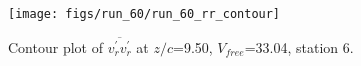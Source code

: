 \begin{figure}[H]
\centering
\texttt{[image: figs/run\_60/run\_60\_rr\_contour]}
\caption{Contour plot of $\overline{v_{r}^{\prime} v_{r}^{\prime}}$ at $z/c$=9.50, $V_{free}$=33.04, station 6.}
\label{fig:run_60_rr_contour}
\end{figure}


